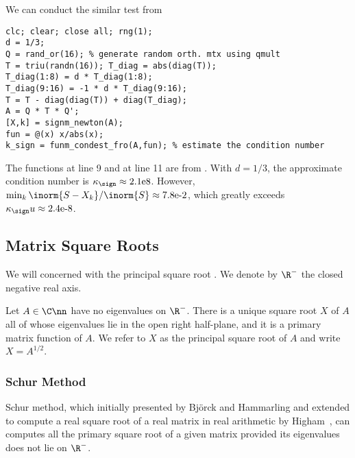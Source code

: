 We can conduct the similar test from 
\begin{lstlisting}
clc; clear; close all; rng(1);
d = 1/3;
Q = rand_or(16); % generate random orth. mtx using qmult
T = triu(randn(16)); T_diag = abs(diag(T));
T_diag(1:8) = d * T_diag(1:8); 
T_diag(9:16) = -1 * d * T_diag(9:16);
T = T - diag(diag(T)) + diag(T_diag);
A = Q * T * Q';
[X,k] = signm_newton(A);
fun = @(x) x/abs(x); 
k_sign = funm_condest_fro(A,fun); % estimate the condition number
\end{lstlisting}

The functions  at line 9 and 
at line 11 are from \cite{high-mft}. With $d = 1/3$, the approximate
condition number is $\kappa_{\sign} \approx \text{2.1e8}$. However,
$\min_{k}\inorm{S - X_{k}}/\inorm{S} \approx \text{7.8e-2}$, which greatly
exceeds $\kappa_{\sign}u \approx \text{2.4e-8}$.

\subsection{Matrix Square Roots}
\label{sec.matrix-square-roots}

We will concerned with the principal square root . We denote by $\R^{-}$ the closed negative real axis.

\begin{theorem}
\label{thm.principal-sqrt}
Let $A\in\C\nn$ have no eigenvalues on $\R^{-}$. There is a unique square
root $X$ of $A$ all of whose eigenvalues lie in the open right half-plane,
and it is a primary matrix function of $A$. We refer to $X$ as the
principal square root of $A$ and write $X = A^{1/2}$.
\end{theorem}


\subsubsection{Schur Method}
\label{sec.schur-method}
Schur method, which initially presented by Bj\"{o}rck and Hammarling
 and extended to compute a real square root of a real
matrix in real arithmetic by Higham~, can
computes all the primary square root of a given matrix provided its
eigenvalues does not lie on $\R^{-}$.

